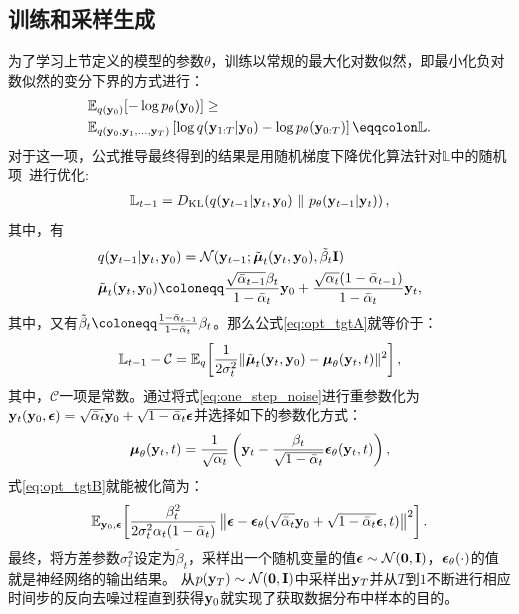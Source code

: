 \subsection{训练和采样生成}
为了学习上节定义的模型的参数$\theta$，训练以常规的最大化对数似然，即最小化负对数似然的变分下界的方式进行：
\begin{equation}
\begin{split}
& \mathbb{E}_{q(\by_0)}[-\log p_\theta(\by_0)] \geq \\
& \mathbb{E}_{q(\by_0, \by_1, \ldots, \by_T)}\left[\log q(\by_{1:T} | \by_0) - \log p_\theta(\by_{0:T})\right] \eqqcolon \mathbb{L}.
\end{split}
\end{equation}
对于这一项，公式推导最终得到的结果是用随机梯度下降优化算法针对$\mathbb{L}$中的随机项~\citep{Ho2020ddpm}进行优化:
\begin{align}
\mathbb{L}_{t-1} = D_{\mathrm{KL}}\!\left(q(\mathbf{y}_{t-1}|\mathbf{y}_t,\mathbf{y}_0) ~ \| ~ p_\theta(\mathbf{y}_{t-1}|\mathbf{y}_t)\right), \label{eq:opt_tgtA}
\end{align}
其中，有
\begin{align}
&q(\by_{t-1}|\by_t,\by_0) = \mathcal{N}(\by_{t-1}; \tilde\bmu_t(\by_t, \by_0), \tilde\beta_t \bI)\\
&\tilde\bmu_t(\by_t, \by_0) \defeq \frac{\sqrt{\bar\alpha_{t-1}}\beta_t }{1-\bar\alpha_t}\by_0 + \frac{\sqrt{\alpha_t}(1- \bar\alpha_{t-1})}{1-\bar\alpha_t} \by_t,
\end{align}
其中，又有$\tilde\beta_t \defeq \frac{1-\bar\alpha_{t-1}}{1-\bar\alpha_t}\beta_t$。那么公式\eqref{eq:opt_tgtA}就等价于：
\begin{align}
  \mathbb{L}_{t-1} - \mathcal{C}
   = \mathbb{E}_{q}\!\left[ \frac{1}{2\sigma_t^2} \|\tilde{{\boldsymbol{\mu}}}_t(\mathbf{y}_t,\mathbf{y}_0) - {\boldsymbol{\mu}}_\theta(\mathbf{y}_t, t)\|^2 \right], \label{eq:opt_tgtB}
\end{align}
其中，$\mathcal{C}$一项是常数。通过将式\eqref{eq:one_step_noise}进行重参数化为$\mathbf{y}_t(\mathbf{y}_0, {\boldsymbol{\epsilon}}) = \sqrt{\bar\alpha_t}\mathbf{y}_0 + \sqrt{1-\bar\alpha_t}{\boldsymbol{\epsilon}}$并选择如下的参数化方式：
\begin{equation} \label{eq:mu_parameterization}
    {\boldsymbol{\mu}}_\theta(\mathbf{y}_t, t) = \frac{1}{\sqrt{\alpha_t}}\left( \mathbf{y}_t - \frac{\beta_t}{\sqrt{1-\bar\alpha_t}} {\boldsymbol{\epsilon}}_\theta(\mathbf{y}_t, t) \right),
\end{equation}
式\eqref{eq:opt_tgtB}就能被化简为：
\begin{align}
    \mathbb{E}_{\mathbf{y}_0, {\boldsymbol{\epsilon}}}\!\left[ \frac{\beta_t^2}{2\sigma_t^2 \alpha_t (1-\bar\alpha_t)}  \left\| {\boldsymbol{\epsilon}} - {\boldsymbol{\epsilon}}_\theta(\sqrt{\bar\alpha_t} \mathbf{y}_0 + \sqrt{1-\bar\alpha_t}{\boldsymbol{\epsilon}}, t) \right\|^2\right]. \label{eq:opt_tgtC}
\end{align}
最终，将方差参数$\sigma_t^2$设定为$\tilde\beta_t$，采样出一个随机变量的值${\boldsymbol{\epsilon}}\sim\mathcal{N}(\mathbf{0},\mathbf{I})$，${\boldsymbol{\epsilon}}_\theta(\cdot)$的值就是神经网络的输出结果。
从$p(\mathbf{y}_T) \sim \mathcal{N}(\mathbf{0}, \mathbf{I})$中采样出$\mathbf{y}_T$并从$T$到$1$不断进行相应时间步的反向去噪过程直到获得$\mathbf{y}_0$就实现了获取数据分布中样本的目的。
